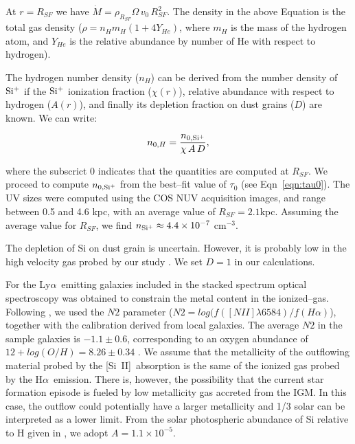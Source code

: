 \documentclass[manuscript]{emulateapj}
\newcommand{\lya}{Ly$\alpha$}
\newcommand{\ha}{H$\alpha$}
\newcommand{\siii}{[Si~{\small II}]}
\begin{document}
At $r=R_{SF}$ we have $\dot{M}=\rho_{R_{SF}} \Omega \, v_{0} \,
R^2_{SF}$. The density in the above Equation is the total gas density
($\rho=n_H m_H (1+4Y_{He})$, where $m_H$ is the mass of the hydrogen
atom, and $Y_{He}$ is the relative abundance by number of He with
respect to hydrogen).

The hydrogen number density ($n_{H}$) can be derived from the number
density of $\rm Si^+$ if the $\rm Si^+$ ionization fraction
($\chi(r)$), relative abundance with respect to hydrogen ($A(r)$), and
finally its depletion fraction on dust grains ($D$) are known.  We can
write:

\begin{equation}
n_{0,H}=\frac{n_{\rm 0,Si^+}}{\chi\,A\,D},
\end{equation}

\noindent 
where the subscrict $0$ indicates that the quantities are computed at
$R_{SF}$.  We proceed to compute $n_{\rm 0, Si^+}$ from the best--fit
value of $\tau_{0}$ (see Eqn~\ref{eqn:tau0}). The UV sizes were
computed using the COS NUV acquisition images, and range between 0.5
and 4.6 kpc, with an average value of $R_{SF}=2.1$kpc. Assuming the
average value for $R_{SF}$, we find $n_{\rm Si^+}\approx 4.4\times
10^{-7}$ cm$^{-3}$.


The depletion of Si on dust grain is uncertain. However, it is
probably low in the high velocity gas probed by our study \citep[see
][for depletion values in high velocity clouds in the Milky
Way]{savage1996}. We set $D=1$ in our calculations.

For the \lya\ emitting galaxies included in the stacked spectrum
optical spectroscopy was obtained to constrain the metal content in
the ionized--gas. Following \citep{cowie2011}, we used the $N2$
parameter ($ N2= log (f([N II]\lambda6584)/f(H\alpha)$), together with
the \citet{pettini2004} calibration derived from local galaxies.  The
average $N2$ in the sample galaxies is $-1.1 \pm 0.6$, corresponding
to an oxygen abundance of $12 + log (O/H) = 8.26 \pm 0.34$ \citep[i.e,
approximately one third solar,][]{prieto2001}. We assume that the
metallicity of the outflowing material probed by the \siii\ absorption
is the same of the ionized gas probed by the \ha\ emission. There is,
however, the possibility that the current star formation episode is
fueled by low metallicity gas accreted from the IGM.  In this case,
the outflow could potentially have a larger metallicity and 1/3 solar
can be interpreted as a lower limit. From the solar photospheric
abundance of Si relative to H given in \citet[][$n_{Si}/n_H=3.2\times
10^{-5}$]{asplund2009}, we adopt $A=1.1\times 10^{-5}$.
\end{document}
